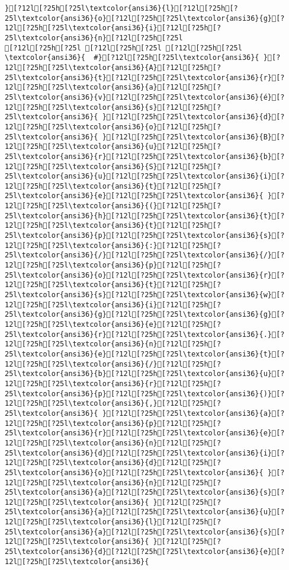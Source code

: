 \documentclass{scrartcl}
\begin{document}
\begin{Verbatim}
}[?12l[?25h[?25l\textcolor{ansi36}{l}[?12l[?25h[?25l\textcolor{ansi36}{o}[?12l[?25h[?25l\textcolor{ansi36}{g}[?12l[?25h[?25l\textcolor{ansi36}{i}[?12l[?25h[?25l\textcolor{ansi36}{n}[?12l[?25h[?25l
[?12l[?25h[?25l [?12l[?25h[?25l [?12l[?25h[?25l
\textcolor{ansi36}{  #}[?12l[?25h[?25l\textcolor{ansi36}{ }[?12l[?25h[?25l\textcolor{ansi36}{A}[?12l[?25h[?25l\textcolor{ansi36}{t}[?12l[?25h[?25l\textcolor{ansi36}{r}[?12l[?25h[?25l\textcolor{ansi36}{a}[?12l[?25h[?25l\textcolor{ansi36}{v}[?12l[?25h[?25l\textcolor{ansi36}{é}[?12l[?25h[?25l\textcolor{ansi36}{s}[?12l[?25h[?25l\textcolor{ansi36}{ }[?12l[?25h[?25l\textcolor{ansi36}{d}[?12l[?25h[?25l\textcolor{ansi36}{o}[?12l[?25h[?25l\textcolor{ansi36}{ }[?12l[?25h[?25l\textcolor{ansi36}{B}[?12l[?25h[?25l\textcolor{ansi36}{u}[?12l[?25h[?25l\textcolor{ansi36}{r}[?12l[?25h[?25l\textcolor{ansi36}{b}[?12l[?25h[?25l\textcolor{ansi36}{S}[?12l[?25h[?25l\textcolor{ansi36}{u}[?12l[?25h[?25l\textcolor{ansi36}{i}[?12l[?25h[?25l\textcolor{ansi36}{t}[?12l[?25h[?25l\textcolor{ansi36}{e}[?12l[?25h[?25l\textcolor{ansi36}{ }[?12l[?25h[?25l\textcolor{ansi36}{(}[?12l[?25h[?25l\textcolor{ansi36}{h}[?12l[?25h[?25l\textcolor{ansi36}{t}[?12l[?25h[?25l\textcolor{ansi36}{t}[?12l[?25h[?25l\textcolor{ansi36}{p}[?12l[?25h[?25l\textcolor{ansi36}{s}[?12l[?25h[?25l\textcolor{ansi36}{:}[?12l[?25h[?25l\textcolor{ansi36}{/}[?12l[?25h[?25l\textcolor{ansi36}{/}[?12l[?25h[?25l\textcolor{ansi36}{p}[?12l[?25h[?25l\textcolor{ansi36}{o}[?12l[?25h[?25l\textcolor{ansi36}{r}[?12l[?25h[?25l\textcolor{ansi36}{t}[?12l[?25h[?25l\textcolor{ansi36}{s}[?12l[?25h[?25l\textcolor{ansi36}{w}[?12l[?25h[?25l\textcolor{ansi36}{i}[?12l[?25h[?25l\textcolor{ansi36}{g}[?12l[?25h[?25l\textcolor{ansi36}{g}[?12l[?25h[?25l\textcolor{ansi36}{e}[?12l[?25h[?25l\textcolor{ansi36}{r}[?12l[?25h[?25l\textcolor{ansi36}{.}[?12l[?25h[?25l\textcolor{ansi36}{n}[?12l[?25h[?25l\textcolor{ansi36}{e}[?12l[?25h[?25l\textcolor{ansi36}{t}[?12l[?25h[?25l\textcolor{ansi36}{/}[?12l[?25h[?25l\textcolor{ansi36}{b}[?12l[?25h[?25l\textcolor{ansi36}{u}[?12l[?25h[?25l\textcolor{ansi36}{r}[?12l[?25h[?25l\textcolor{ansi36}{p}[?12l[?25h[?25l\textcolor{ansi36}{)}[?12l[?25h[?25l\textcolor{ansi36}{,}[?12l[?25h[?25l\textcolor{ansi36}{ }[?12l[?25h[?25l\textcolor{ansi36}{a}[?12l[?25h[?25l\textcolor{ansi36}{p}[?12l[?25h[?25l\textcolor{ansi36}{r}[?12l[?25h[?25l\textcolor{ansi36}{e}[?12l[?25h[?25l\textcolor{ansi36}{n}[?12l[?25h[?25l\textcolor{ansi36}{d}[?12l[?25h[?25l\textcolor{ansi36}{i}[?12l[?25h[?25l\textcolor{ansi36}{d}[?12l[?25h[?25l\textcolor{ansi36}{o}[?12l[?25h[?25l\textcolor{ansi36}{ }[?12l[?25h[?25l\textcolor{ansi36}{n}[?12l[?25h[?25l\textcolor{ansi36}{a}[?12l[?25h[?25l\textcolor{ansi36}{s}[?12l[?25h[?25l\textcolor{ansi36}{ }[?12l[?25h[?25l\textcolor{ansi36}{a}[?12l[?25h[?25l\textcolor{ansi36}{u}[?12l[?25h[?25l\textcolor{ansi36}{l}[?12l[?25h[?25l\textcolor{ansi36}{a}[?12l[?25h[?25l\textcolor{ansi36}{s}[?12l[?25h[?25l\textcolor{ansi36}{ }[?12l[?25h[?25l\textcolor{ansi36}{d}[?12l[?25h[?25l\textcolor{ansi36}{e}[?12l[?25h[?25l\textcolor{ansi36}{ 
\end{Verbatim}
\end{document}
